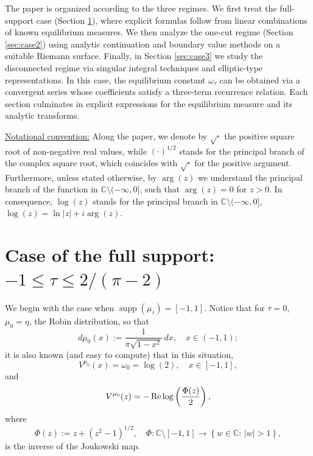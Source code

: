 \documentclass[reqno,11pt]{amsart}
\theoremstyle{plain}
\theoremstyle{definition}
\theoremstyle{remark}
\numberwithin{equation}{section}
\renewcommand{\Re}{\mathop{\rm Re}}
\DeclareMathOperator{\supp}{supp}
\newcommand{\C}{\mathbb{C}}
\begin{document}
The paper is organized according to the three regimes. We first treat the full-support case (Section \ref{sec:case1}), where explicit formulas follow from linear combinations of known equilibrium measures. We then analyze the one-cut regime (Section \ref{sec:case2}) using analytic continuation and boundary value methods on a suitable Riemann surface. Finally, in Section \ref{sec:case3} we study the disconnected regime via singular integral techniques and elliptic-type representations. In this case, the equilibrium constant $ \omega_\tau$ can be 
obtained via a convergent series whose coefficients satisfy a three-term recurrence relation. 
Each section culminates in explicit expressions for the equilibrium measure and its analytic transforms.

\underline{Notational convention:} Along the paper, we denote by $\sqrt{\cdot}$ the positive square root of non-negative real values, while $\left(\cdot\right)^{1/2}$ stands for the principal branch of the complex square root, which coincides with $\sqrt{\cdot}$ for the positive argument. Furthermore, unless stated otherwise, by $\arg(z)$ we understand the principal branch of the function in $\C \setminus (-\infty, 0]$, such that $\arg(z)=0$ for $z>0$. In consequence, $\log(z)$ stands for the principal branch in $\C \setminus (-\infty, 0]$, $\log(z)=\ln|z|+i \arg(z)$.


\section{Case of the full support: \texorpdfstring{$-1\le \tau\le 2/(\pi-2)$}{-1\le \tau{}/()}} \label{sec:case1}

We begin with the case when $\supp(\mu_\tau)=[-1,1]$. Notice that for $\tau=0$, $\mu_0=\eta$, the Robin distribution, so that
$$
d\mu_0(x):=\frac{1}{\pi \sqrt{1-x^2}}\, dx, \quad x\in (-1,1);
$$
it is also known (and easy to compute) that in this situation,
$$
V^{\mu_0}(x) =\omega_0=  \log(2), \quad x\in [-1,1], 
$$
and
$$
V^{\mu_0}(z) = -\Re \log\left(\frac{\Phi(z)}{2} \right),
$$
where
\begin{equation}
    \label{defPhi}
    \Phi(z):= z+\left(z^2-1 \right)^{1/2}, \quad \Phi:\C\setminus [-1,1] \longrightarrow \left\{ w\in \C:\, |w|>1\right\},
\end{equation}
is the inverse of the Joukowski map.
\end{document}
